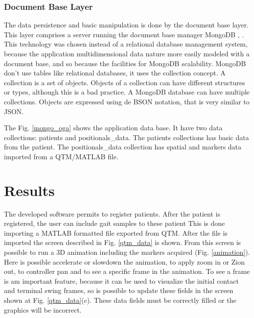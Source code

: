 \documentclass[journal]{IEEEtran}
\begin{document}
\subsubsection{Document Base Layer}
\label{document_base_layer}


The data persistence and basic manipulation is done by the document base layer.
This layer comprises a server running the document base manager MongoDB 
\cite{Plugge2014}, \cite{Plugge2014}.
This technology was chosen instead of a relational database management system, 
because the application multidimensional data nature more  easily  modeled with
a document base, and so because the facilities for MongoDB scalability.
MongoDB don't use tables like relational databases, it uses the collection concept.
A collection is a set of objects. Objects of a collection can have different structures
or types, although this is a bad practice. A MongoDB database can have multiple collections.
Objects are expressed using de BSON notation, that is very similar to JSON.

The Fig. \ref{mongo_oga} shows the application data base.
It have two data collections: patients and positionals\_data.
The patients collections has basic data from the patient.
The positionals\_data collection has spatial and markers 
data imported from a QTM/MATLAB file.

\section{Results}

The developed software permits to register patients.
After the patient is registered, the user can include gait samples to these patient
This is done importing a MATLAB formatted file exported from QTM. 
After the file is imported the screen described in Fig. \ref{qtm_data} is shown.
From this screen is possible to run a 3D animation including the markers acquired (Fig. \ref{animation}).
Here is possible accelerate or slowdown the animation, to apply zoom in or Zion out, to controller pan
and to see a specific frame in the animation.
To see a frame is am important feature, because it can be used to visualize the initial contact
and terminal swing frames, 
so is possible to update these fields in the screen shown at Fig. \ref{qtm_data}(c).
These data fields must be correctly filled or the graphics will be incorrect.
\end{document}
